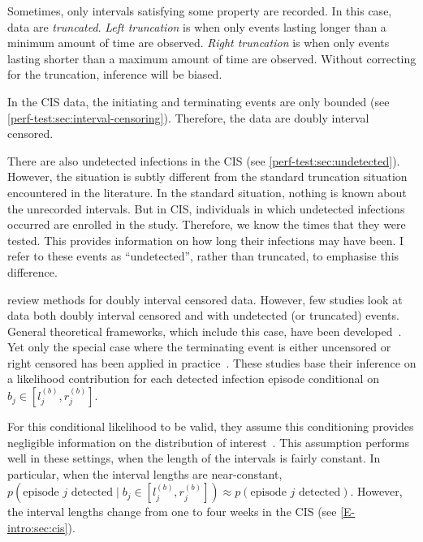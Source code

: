 \documentclass[thesis.tex]{subfiles}
\begin{document}
Sometimes, only intervals satisfying some property are recorded.
In this case, data are \emph{truncated}.
\emph{Left truncation} is when only events lasting longer than a minimum amount of time are observed.
\emph{Right truncation} is when only events lasting shorter than a maximum amount of time are observed.
Without correcting for the truncation, inference will be biased.

In the CIS data, the initiating and terminating events are only bounded (see \cref{perf-test:sec:interval-censoring}).
Therefore, the data are doubly interval censored.

There are also undetected infections in the CIS (see \cref{perf-test:sec:undetected}).
However, the situation is subtly different from the standard truncation situation encountered in the literature.
In the standard situation, nothing is known about the unrecorded intervals.
But in CIS, individuals in which undetected infections occurred are enrolled in the study.
Therefore, we know the times that they were tested.
This provides information on how long their infections may have been.
I refer to these events as ``undetected'', rather than truncated, to emphasise this difference.

\Textcite{sunAnalysis,bogaertsSurvival} review methods for doubly interval censored data.
However, few studies look at data both doubly interval censored and with undetected (or truncated) events.
General theoretical frameworks, which include this case, have been developed~\autocite{turnbullEmpirical,dempsterMaximum}.
Yet only the special case where the terminating event is either uncensored or right censored has been applied in practice~\autocite[e.g.][]{sunEmpirical,bacchettiNonparametric,shenNonparametric}.
These studies base their inference on a likelihood contribution for each detected infection episode conditional on $b_j \in [l_j^{(b)}, r_j^{(b)}]$.

For this conditional likelihood to be valid, they assume this conditioning provides negligible information on the distribution of interest~.
This assumption performs well in these settings, when the length of the intervals is fairly constant.
In particular, when the interval lengths are near-constant, $p(\text{episode $j$ detected} \mid b_j \in [l_j^{(b)}, r_j^{(b)}]) \approx p(\text{episode $j$ detected})$.
However, the interval lengths change from one to four weeks in the CIS (see \cref{E-intro:sec:cis}).
\end{document}
